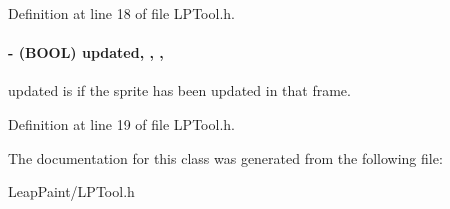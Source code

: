 Definition at line 18 of file L\-P\-Tool.\-h.

\hypertarget{interface_l_p_tool_a25dbad647c537177b138bdbbb01936e4}{
\paragraph[{updated}]{\setlength{\rightskip}{0pt plus 5cm}-\/ (B\-O\-O\-L) updated\hspace{0.3cm}{\ttfamily [read]}, {\ttfamily [write]}, {\ttfamily [nonatomic]}, {\ttfamily [assign]}}}\label{d3/d2e/interface_l_p_tool_a25dbad647c537177b138bdbbb01936e4}
updated is if the sprite has been updated in that frame. 

Definition at line 19 of file L\-P\-Tool.\-h.



The documentation for this class was generated from the following file\-:\begin{DoxyCompactItemize}
\item 
Leap\-Paint/L\-P\-Tool.\-h\end{DoxyCompactItemize}
